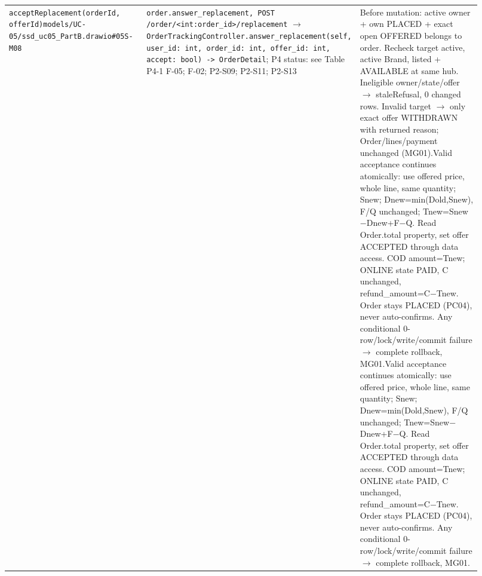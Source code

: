 \begin{longtable}{>{\raggedright\arraybackslash}p{0.3067\linewidth}>{\raggedright\arraybackslash}p{0.3067\linewidth}>{\raggedright\arraybackslash}p{0.3067\linewidth}}
\texttt{acceptReplacement(orderId, offerId)}\newline{}\texttt{models/\allowbreak{}UC-05/\allowbreak{}ssd\_\allowbreak{}uc05\_\allowbreak{}PartB.\allowbreak{}drawio\#05S-M08} & \texttt{order.\allowbreak{}answer\_\allowbreak{}replacement, POST /\allowbreak{}order/\allowbreak{}\textless{}int:order\_\allowbreak{}id\textgreater{}/\allowbreak{}replacement} \ensuremath{\rightarrow} \texttt{OrderTrackingController.\allowbreak{}answer\_\allowbreak{}replacement(self, user\_\allowbreak{}id: int, order\_\allowbreak{}id: int, offer\_\allowbreak{}id: int, accept: bool) -\textgreater{} OrderDetail}; P4 status: see Table P4-1 F-05; F-02; P2-S09; P2-S11; P2-S13 & Before mutation: active owner + own PLACED + exact open OFFERED belongs to order. Recheck target active, active Brand, listed + AVAILABLE at same hub. Ineligible owner/state/offer \ensuremath{\rightarrow} staleRefusal, 0 changed rows. Invalid target \ensuremath{\rightarrow} only exact offer WITHDRAWN with returned reason; Order/lines/payment unchanged (MG01).\newline{}Valid acceptance continues atomically: use offered price, whole line, same quantity; Snew; Dnew=min(Dold,Snew), F/Q unchanged; Tnew=Snew\ensuremath{-}Dnew+F\ensuremath{-}Q. Read Order.total property, set offer ACCEPTED through data access. COD amount=Tnew; ONLINE state PAID, C unchanged, refund\_amount=C\ensuremath{-}Tnew. Order stays PLACED (PC04), never auto-confirms. Any conditional 0-row/lock/write/commit failure \ensuremath{\rightarrow} complete rollback, MG01.\newline{}Valid acceptance continues atomically: use offered price, whole line, same quantity; Snew; Dnew=min(Dold,Snew), F/Q unchanged; Tnew=Snew\ensuremath{-}Dnew+F\ensuremath{-}Q. Read Order.total property, set offer ACCEPTED through data access. COD amount=Tnew; ONLINE state PAID, C unchanged, refund\_amount=C\ensuremath{-}Tnew. Order stays PLACED (PC04), never auto-confirms. Any conditional 0-row/lock/write/commit failure \ensuremath{\rightarrow} complete rollback, MG01. \\

\end{longtable}
